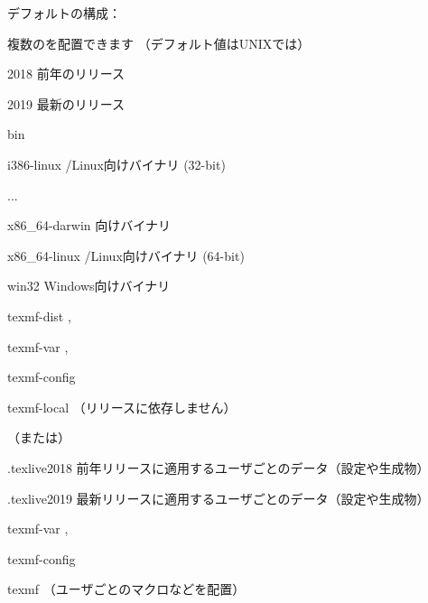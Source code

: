 \documentclass[uplatex,dvipdfmx]{jsarticle}
\begin{document}
\noindent
デフォルトの\TL 構成：
%
\begin{description}
\item[システム用ルート] 複数の\TL を配置できます
  （デフォルト値はUNIXでは）
  \begin{ttdescription}
  \item[2018] 前年のリリース
  \item[2019] 最新のリリース
    \begin{ttdescription}
    \item[bin] ~
      \begin{ttdescription}
      \item[i386-linux] \GNU/Linux向けバイナリ (32-bit)
      \item[...]
      \item[x86\_64-darwin] \macOS 向けバイナリ
      \item[x86\_64-linux] \GNU/Linux向けバイナリ (64-bit)
      \item[win32] Windows向けバイナリ
      \end{ttdescription}
    \item[texmf-dist] , 
    \item[texmf-var] , 
    \item[texmf-config] 
    \end{ttdescription}
  \item[texmf-local] （リリースに依存しません）
  \end{ttdescription}
\item[ユーザのホームディレクトリ] （または）
  \begin{ttdescription}
  \item[.texlive2018] 前年リリースに適用するユーザごとのデータ（設定や生成物）
  \item[.texlive2019] 最新リリースに適用するユーザごとのデータ（設定や生成物）
    \begin{ttdescription}
    \item[texmf-var] , 
    \item[texmf-config] 
    \end{ttdescription}
  \item[texmf] （ユーザごとのマクロなどを配置）
  \end{ttdescription}
\end{description}
\end{document}
